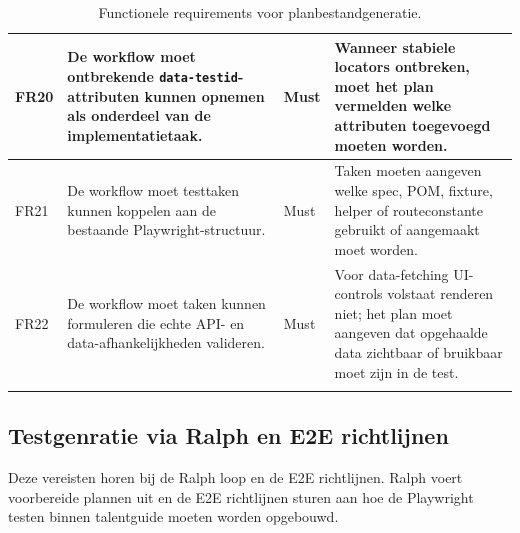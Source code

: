 \begin{longtable}{p{}p{}p{}p{}}
    \midrule
    FR20 & De workflow moet ontbrekende \texttt{data-testid}-attributen kunnen opnemen als onderdeel van de implementatietaak. & Must & Wanneer stabiele locators ontbreken, moet het plan vermelden welke attributen toegevoegd moeten worden. \\
    \midrule
    FR21 & De workflow moet testtaken kunnen koppelen aan de bestaande Playwright-structuur. & Must & Taken moeten aangeven welke spec, POM, fixture, helper of routeconstante gebruikt of aangemaakt moet worden. \\
    \midrule
    FR22 & De workflow moet taken kunnen formuleren die echte API- en data-afhankelijkheden valideren. & Must & Voor data-fetching UI-controls volstaat renderen niet; het plan moet aangeven dat opgehaalde data zichtbaar of bruikbaar moet zijn in de test. \\
    
    \bottomrule
    \caption[Functionele requirements voor planbestandgeneratie]{Functionele requirements voor planbestandgeneratie.}
    \label{tab:fr-planbestandgeneratie}
\end{longtable}

\subsection{Testgenratie via Ralph en E2E richtlijnen}
Deze vereisten horen bij de Ralph loop en de E2E richtlijnen. Ralph voert voorbereide plannen uit en de E2E richtlijnen sturen aan hoe de Playwright testen binnen talentguide moeten worden opgebouwd.


